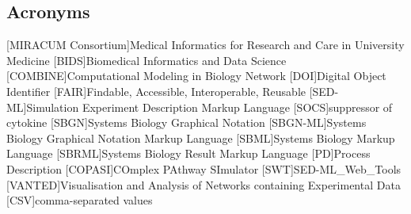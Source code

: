 \subsection*{Acronyms}
    \begin{acronym}[acrmeta]
        [MIRACUM Consortium]{Medical Informatics for Research and Care in University
Medicine}
        [BIDS]{Biomedical Informatics and Data Science}
        [COMBINE]{Computational Modeling in Biology Network}
        [DOI]{Digital Object Identifier}
        [FAIR]{Findable, Accessible, Interoperable, Reusable}
        [SED-ML]{Simulation Experiment Description Markup Language}
        [SOCS]{suppressor of cytokine}
        [SBGN]{Systems Biology Graphical Notation}
        [SBGN-ML]{Systems Biology Graphical Notation Markup Language}
        [SBML]{Systems Biology Markup Language}
        [SBRML]{Systems Biology Result Markup Language}
        [PD]{Process Description}
        [COPASI]{COmplex PAthway SImulator}
        [SWT]{SED-ML\_Web\_Tools}
        [VANTED]{Visualisation and Analysis of Networks containing Experimental Data}
        [CSV]{comma-separated values}
    \end{acronym}